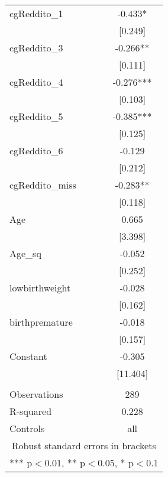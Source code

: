 \documentclass[]{article}
\begin{document}
\begin{tabular}{lc}
cgReddito\_1 & -0.433* \\
 & [0.249] \\
cgReddito\_3 & -0.266** \\
 & [0.111] \\
cgReddito\_4 & -0.276*** \\
 & [0.103] \\
cgReddito\_5 & -0.385*** \\
 & [0.125] \\
cgReddito\_6 & -0.129 \\
 & [0.212] \\
cgReddito\_miss & -0.283** \\
 & [0.118] \\
Age & 0.665 \\
 & [3.398] \\
Age\_sq & -0.052 \\
 & [0.252] \\
lowbirthweight & -0.028 \\
 & [0.162] \\
birthpremature & -0.018 \\
 & [0.157] \\
Constant & -0.305 \\
 & [11.404] \\
 &  \\
Observations & 289 \\
R-squared & 0.228 \\
 Controls & all \\ \hline
\multicolumn{2}{c}{ Robust standard errors in brackets} \\
\multicolumn{2}{c}{ *** p$<$0.01, ** p$<$0.05, * p$<$0.1} \\
\end{tabular}
\end{document}
